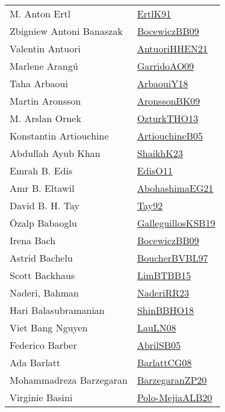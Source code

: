 {\begin{longtable}{p{4cm}p{20cm}}
M. Anton Ertl & \href{papers/ErtlK91.pdf}{ErtlK91}\cite{ErtlK91} \\
Zbigniew Antoni Banaszak & \href{}{BocewiczBB09}\cite{BocewiczBB09} \\
Valentin Antuori & \href{papers/AntuoriHHEN21.pdf}{AntuoriHHEN21}\cite{AntuoriHHEN21} \\
Marlene Arang{\'{u}} & \href{articles/GarridoAO09.pdf}{GarridoAO09}\cite{GarridoAO09} \\
Taha Arbaoui & \href{papers/ArbaouiY18.pdf}{ArbaouiY18}\cite{ArbaouiY18} \\
Martin Aronsson & \href{papers/AronssonBK09.pdf}{AronssonBK09}\cite{AronssonBK09} \\
M. Arslan Ornek & \href{articles/OzturkTHO13.pdf}{OzturkTHO13}\cite{OzturkTHO13} \\
Konstantin Artiouchine & \href{papers/ArtiouchineB05.pdf}{ArtiouchineB05}\cite{ArtiouchineB05} \\
Abdullah Ayub Khan & \href{}{ShaikhK23}\cite{ShaikhK23} \\
Emrah B. Edis & \href{papers/EdisO11.pdf}{EdisO11}\cite{EdisO11} \\
Amr B. Eltawil & \href{articles/AbohashimaEG21.pdf}{AbohashimaEG21}\cite{AbohashimaEG21} \\
David B. H. Tay & \href{}{Tay92}\cite{Tay92} \\
{\"{O}}zalp Babaoglu & \href{papers/GalleguillosKSB19.pdf}{GalleguillosKSB19}\cite{GalleguillosKSB19} \\
Irena Bach & \href{}{BocewiczBB09}\cite{BocewiczBB09} \\
Astrid Bachelu & \href{}{BoucherBVBL97}\cite{BoucherBVBL97} \\
Scott Backhaus & \href{papers/LimBTBB15.pdf}{LimBTBB15}\cite{LimBTBB15} \\
Naderi, Bahman & \href{articles/NaderiRR23.pdf}{NaderiRR23}\cite{NaderiRR23} \\
Hari Balasubramanian & \href{articles/ShinBBHO18.pdf}{ShinBBHO18}\cite{ShinBBHO18} \\
Viet Bang Nguyen & \href{papers/LauLN08.pdf}{LauLN08}\cite{LauLN08} \\
Federico Barber & \href{papers/AbrilSB05.pdf}{AbrilSB05}\cite{AbrilSB05} \\
Ada Barlatt & \href{papers/BarlattCG08.pdf}{BarlattCG08}\cite{BarlattCG08} \\
Mohammadreza Barzegaran & \href{papers/BarzegaranZP20.pdf}{BarzegaranZP20}\cite{BarzegaranZP20} \\
Virginie Basini & \href{}{Polo-MejiaALB20}\cite{Polo-MejiaALB20} \\

\end{longtable}}
